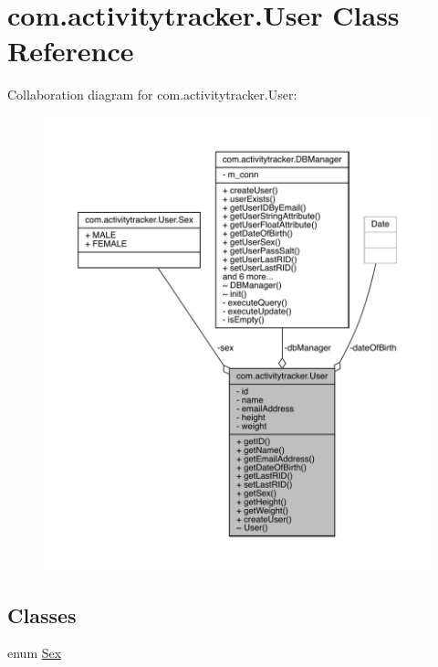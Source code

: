 \hypertarget{classcom_1_1activitytracker_1_1_user}{}\section{com.\+activitytracker.\+User Class Reference}
\label{classcom_1_1activitytracker_1_1_user}


Collaboration diagram for com.\+activitytracker.\+User\+:
\nopagebreak
\begin{figure}[H]
\begin{center}
\leavevmode
\includegraphics[width=350pt]{classcom_1_1activitytracker_1_1_user__coll__graph}
\end{center}
\end{figure}
\subsection*{Classes}
\begin{DoxyCompactItemize}
\item 
enum \mbox{\hyperlink{enumcom_1_1activitytracker_1_1_user_1_1_sex}{Sex}}
\end{DoxyCompactItemize}
